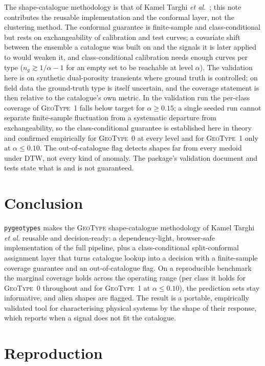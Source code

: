 \documentclass[journal]{IEEEtran}
\newcommand{\gt}{\textsc{GeoType}}
\begin{document}
The shape-catalogue methodology is that of Kamel Targhi \emph{et al.}~\cite{geotypes}; this
note contributes the reusable implementation and the conformal layer, not the clustering method. The conformal
guarantee is finite-sample and class-conditional but rests on exchangeability of calibration and test curves; a
covariate shift between the ensemble a catalogue was built on and the signals it is later applied to would weaken
it, and class-conditional calibration needs enough curves per type ($n_g \gtrsim 1/\alpha - 1$ for an empty set
to be reachable at level $\alpha$). The validation here is on synthetic dual-porosity transients where ground
truth is controlled; on field data the ground-truth type is itself uncertain, and the coverage statement is then
relative to the catalogue's own metric. In the validation run the per-class coverage of \gt{}~1 falls below
target for $\alpha \ge 0.15$; a single seeded run cannot separate finite-sample fluctuation from a systematic
departure from exchangeability, so the class-conditional guarantee is established here in theory and confirmed
empirically for \gt{}~0 at every level and for \gt{}~1 only at $\alpha \le 0.10$. The out-of-catalogue flag
detects shapes far from every medoid under DTW, not every kind of anomaly. The package's validation document and tests state what is and is not guaranteed.

\section{Conclusion}

\texttt{pygeotypes} makes the \gt{} shape-catalogue methodology of Kamel Targhi \emph{et al.} reusable and
decision-ready: a dependency-light, browser-safe implementation of the full pipeline, plus a class-conditional
split-conformal assignment layer that turns catalogue lookup into a decision with a finite-sample coverage
guarantee and an out-of-catalogue flag. On a reproducible benchmark the marginal coverage holds across the
operating range (per class it holds for \gt{}~0 throughout and for \gt{}~1 at $\alpha \le 0.10$), the
prediction sets stay informative, and alien shapes are flagged. The result is a portable, empirically validated
tool for characterising physical systems by the shape of their response, which reports when a signal does not
fit the catalogue.

\appendices
\section{Reproduction}\label{app:repro}
\end{document}
